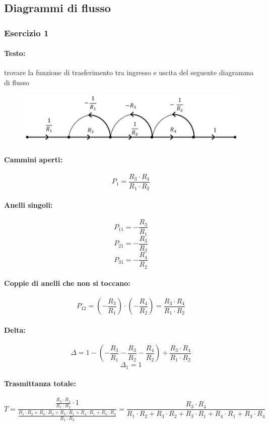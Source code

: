 \documentclass[a4paper]{article}
\begin{document}
	
	\subsection{Diagrammi di flusso}
	
	\subsubsection{Esercizio 1}
	\paragraph{Testo:}
	trovare la funzione di trasferimento tra ingresso e uscita del seguente diagramma di flusso
	\begin{figure}[h]
		\centering
		\includegraphics{flusso}
		\label{fig:flusso}
	\end{figure}
	
	\paragraph{Cammini aperti:}
	\[ P_1 = \frac{R_3 \cdot R_4}{R_1 \cdot R_2} \]
	\paragraph{Anelli singoli:}
	\[ P_{11} = - \frac{R_3}{R_1} \]
	\[ P_{21} = - \frac{R_3}{R_2} \]
	\[ P_{31} = - \frac{R_4}{R_2} \]
	\paragraph{Coppie di anelli che non si toccano:}
	\[ P_{12} = \left( - \frac{R_3}{R_1} \right) \cdot \left( - \frac{R_4}{R_2} \right) = \frac{R_3 \cdot R_4}{R_1 \cdot R_2} \]
	\paragraph{Delta:}
	\[ \Delta = 1 - \left( - \frac{R_3}{R_1} - \frac{R_3}{R_2} - \frac{R_4}{R_2} \right) + \frac{R_3 \cdot R_4}{R_1 \cdot R_2} \]
	\[ \Delta_1 = 1 \]
	\paragraph{Trasmittanza totale:}
	\[
	T = \frac{\frac{R_3 \cdot R_4}{R_1 \cdot R_2} \cdot 1}{\frac{R_1 \cdot R_2 + R_3 \cdot R_2 + R_3 \cdot R_1 + R_4 \cdot R_1 + R_3 \cdot R_4}{R_1 \cdot R_2}} = \frac{R_3 \cdot R_4}{R_1 \cdot R_2 + R_3 \cdot R_2 + R_3 \cdot R_1 + R_4 \cdot R_1 + R_3 \cdot R_4}
	\]
	\newpage
	
\end{document}

